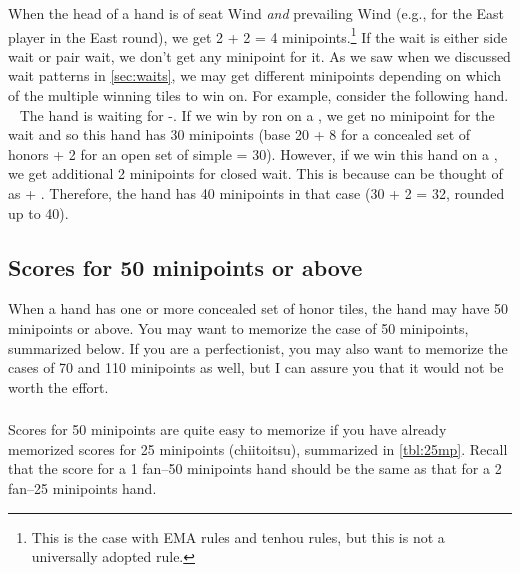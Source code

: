 \bigskip
When the head of a hand is of seat Wind \emph{and} prevailing Wind (e.g., {\large\dong} for the East player in the East round), we get 2 + 2 = 4 minipoints.\footnote{This is the case with EMA rules and {\jap tenhou} rules, but this is not a universally adopted rule.} 
If the wait is either side wait or pair wait, we don't get any minipoint for it.
As we saw when we discussed wait patterns in \ref{sec:waits}, we may get different minipoints depending on which of the multiple winning tiles to win on. 
For example, consider the following hand.
\bp
{}\zhong\zhong\zhong~
\ep
The hand is waiting for {\large{}-}. If we win by {\jap ron} on a {\large{}}, we get no minipoint for the wait and so this hand has 30 minipoints (base 20 + 8 for a concealed set of honors + 2 for an open set of simple = 30). However, if we win this hand on a {\large{}}, we get additional 2 minipoints for closed wait. This is because {\large{}} can be thought of as {\large{} + }. Therefore, the hand has 40 minipoints in that case (30 + 2 = 32, rounded up to 40). 

\bigskip
\subsection{Scores for 50 minipoints or above}
\bigskip
When a hand has one or more concealed set of honor tiles, the hand may have 50 minipoints or above. You may want to memorize the case of 50 minipoints, summarized below. 
If you are a perfectionist, you may also want to memorize the cases of 70 and 110 minipoints as well, but I can assure you that it would not be worth the effort. 

\subsubsection{}
\noindent Scores for 50 minipoints are quite easy to memorize if you have already memorized scores for 25 minipoints ({\jap chiitoitsu}), summarized in \ref{tbl:25mp}. Recall that the score for a 1 {\jap fan}--50 minipoints hand should be the same as that for a 2 {\jap fan}--25 minipoints hand.

